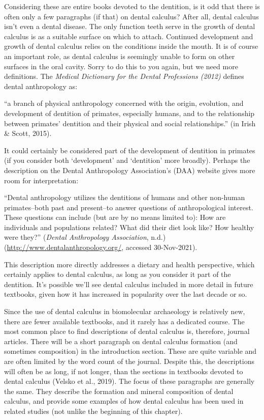 \documentclass[
  letterpaper,
]{book}
\begin{document}
Considering these are entire books devoted to the dentition, is it odd
that there is often only a few paragraphs (if that) on dental calculus?
After all, dental calculus isn't even a dental disease. The only
function teeth serve in the growth of dental calculus is as a suitable
surface on which to attach. Continued development and growth of dental
calculus relies on the conditions inside the mouth. It is of course an
important role, as dental calculus is seemingly unable to form on other
surfaces in the oral cavity. Sorry to do this to you again, but we need
more definitions. The \emph{Medical Dictionary for the Dental
Professions (2012)} defines dental anthropology as:

``a branch of physical anthropology concerned with the origin,
evolution, and development of dentition of primates, especially humans,
and to the relationship between primates' dentition and their physical
and social relationships.'' (in Irish \& Scott, 2015).

It could certainly be considered part of the development of dentition in
primates (if you consider both `development' and `dentition' more
broadly). Perhaps the description on the Dental Anthropology
Association's (DAA) website gives more room for interpretation:

``Dental anthropology utilizes the dentitions of humans and other
non-human primates--both past and present--to answer questions of
anthropological interest. These questions can include (but are by no
means limited to): How are individuals and populations related? What did
their diet look like? How healthy were they?'' (\emph{Dental
{Anthropology Association}}, n.d.)
(\url{http://www.dentalanthropology.org/}, accessed 30-Nov-2021).

This description more directly addresses a dietary and health
perspective, which certainly applies to dental calculus, as long as you
consider it part of the dentition. It's possible we'll see dental
calculus included in more detail in future textbooks, given how it has
increased in popularity over the last decade or so.

Since the use of dental calculus in biomolecular archaeology is
relatively new, there are fewer available textbooks, and it rarely has a
dedicated course. The most common place to find descriptions of dental
calculus is, therefore, journal articles. There will be a short
paragraph on dental calculus formation (and sometimes composition) in
the introduction section. These are quite variable and are often limited
by the word count of the journal. Despite this, the descriptions will
often be as long, if not longer, than the sections in textbooks devoted
to dental calculus (Velsko et al., 2019). The focus of these paragraphs
are generally the same. They describe the formation and mineral
composition of dental calculus, and provide some examples of how dental
calculus has been used in related studies (not unlike the beginning of
this chapter).
\end{document}
